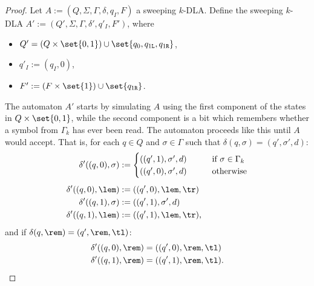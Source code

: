 \begin{proof}
	\newcommand{\ql}{q_{1\mathtt{L}}}
	\newcommand{\qr}{q_{1\mathtt{R}}}

	Let $A:=(Q,\Sigma,\Gamma,\delta,q_I,F)$ a sweeping $k$-DLA.
	Define the sweeping $k$-DLA $A':=(Q',\Sigma,\Gamma,\delta',q'_I,F')$, where
	\begin{itemize}
		\item $Q'=(Q\times\set{0,1})\cup\set{q_0,\ql,\qr}$,
		\item $q'_I:=(q_I,0)$,
		\item $F':=(F\times\set{1})\cup\set{\qr}$.
	\end{itemize}

	The automaton $A'$ starts by simulating $A$ using the first component of the states in $Q\times\set{0,1}$, while the second component is a bit which remembers whether a symbol from $\Gamma_k$ has ever been read.
	The automaton proceeds like this until $A$ would accept.
	That is, for each $q\in Q$ and $\sigma\in\Gamma$ such that $\delta(q,\sigma)=(q',\sigma',d)$:
	\begin{align*}
		\delta'((q,0),\sigma) & :=\begin{cases}
			                          ((q',1),\sigma',d) \qquad & \text{if }\sigma\in\Gamma_k \\
			                          ((q',0),\sigma',d) \qquad & \text{otherwise}
		                          \end{cases} \\[1ex]
		\delta'((q,0),\lem)   & :=((q',0),\lem,\tr)                                       \\
		\delta'((q,1),\sigma) & :=((q',1),\sigma',d)                                      \\
		\delta'((q,1),\lem)   & :=((q',1),\lem,\tr) \text,
	\end{align*}
	and if $\delta(q,\rem)=(q',\rem,\tl)$:
	\begin{align*}
		\delta'((q,0),\rem) & =((q',0),\rem,\tl)        \\
		\delta'((q,1),\rem) & =((q',1),\rem,\tl) \text.
	\end{align*}


\end{proof}
